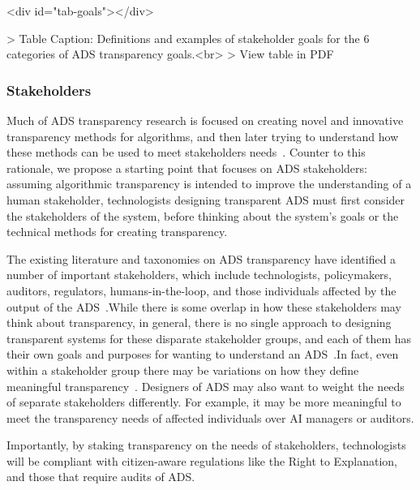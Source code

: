 \documentclass[sigconf, nonacm]{acmart}
\begin{document}
\begin{table}<div id="tab-goals"></div>

> Table Caption: Definitions and examples of stakeholder goals for the 6 categories of ADS transparency goals.<br>
> View table in PDF
\end{table}

\subsubsection{Stakeholders} Much of ADS transparency research is focused on creating novel and innovative transparency methods for algorithms, and then later trying to understand how these methods can be used to meet stakeholders needs~\cite{bhatt2020explainable, preece2018stakeholders}. Counter to this rationale, we propose a starting point that focuses on ADS stakeholders: assuming algorithmic transparency is intended to improve the understanding of a human stakeholder, technologists designing transparent ADS must first consider the stakeholders of the system, before thinking about the system's goals or the technical methods for creating transparency.

The existing literature and taxonomies on ADS transparency have identified a number of important stakeholders, which include technologists, policymakers, auditors, regulators, humans-in-the-loop, and those individuals affected by the output of the ADS~\cite{DBLP:journals/corr/abs-2010-14374, meske, meyers2007street}.While there is some overlap in how these stakeholders may think about transparency, in general, there is no single approach to designing transparent systems for these disparate stakeholder groups, and each of them has their own goals and purposes for wanting to understand an ADS~\cite{DBLP:journals/corr/abs-2001-09734}.In fact, even within a stakeholder group there may be variations on how they define meaningful transparency~\cite{DBLP:conf/chi/HohmanHCDD19}. Designers of ADS may also want to weight the needs of separate stakeholders differently. For example, it may be more meaningful to meet the transparency needs of affected individuals over AI managers or auditors.

Importantly, by staking transparency on the needs of stakeholders, technologists will be compliant with citizen-aware regulations like the Right to Explanation, and those that require audits of ADS.
\end{document}
